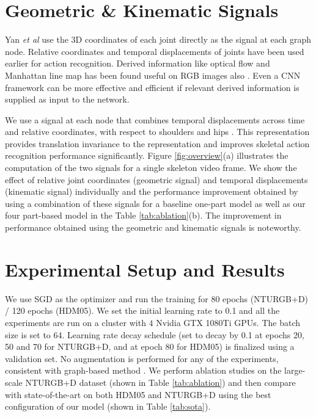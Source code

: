 \documentclass{bmvc2k}
\def\etal{\emph{et al}\bmvaOneDot}
\begin{document}
\section{Geometric \& Kinematic Signals}
\label{sec:signals}
Yan \etal \cite{yan2018spatial} use the 3D coordinates of each joint directly as the signal at each graph node. Relative coordinates \cite{zhang2017geometric, ke2017new} and temporal displacements \cite{zanfir2013moving} of joints have been used earlier for action recognition. Derived information like optical flow and Manhattan line map has been found useful on RGB images also \cite{wang2016temporal,zou2018layoutnet}. Even a CNN framework can be more effective and efficient if relevant derived information is supplied as input to the network.

We use a signal at each node that combines temporal displacements across time and relative coordinates, with respect to shoulders and hips \cite{ke2017new}.  This representation provides translation invariance to the representation \cite{verma2018feastnet} and improves skeletal action recognition performance significantly. Figure \ref{fig:overview}(a) illustrates the computation of the two signals for a single skeleton video frame. We show the effect of relative joint coordinates (geometric signal) and temporal displacements (kinematic signal) individually and the performance improvement obtained by using a combination of these signals for a baseline one-part model as well as our four part-based model in the Table \ref{tab:ablation}(b). The improvement in performance obtained using the geometric and kinematic signals is noteworthy.

\section{Experimental Setup and Results}
\label{sec:exp_res}
We use SGD as the optimizer and run the training for 80 epochs (NTURGB+D) / 120 epochs (HDM05). We set the initial learning rate to 0.1 and all the experiments are run on a cluster with $4$ Nvidia GTX 1080Ti GPUs. The batch size is set to 64. Learning rate decay schedule (set to decay by 0.1 at epochs 20, 50 and 70 for NTURGB+D, and at epoch 80 for HDM05) is finalized using a validation set. No augmentation is performed for any of the experiments, consistent with graph-based method \cite{yan2018spatial}. We perform ablation studies on the large-scale NTURGB+D dataset (shown in Table \ref{tab:ablation}) and then compare with state-of-the-art on both HDM05 and NTURGB+D using the best configuration of our model (shown in Table \ref{tab:sota}).
\end{document}
